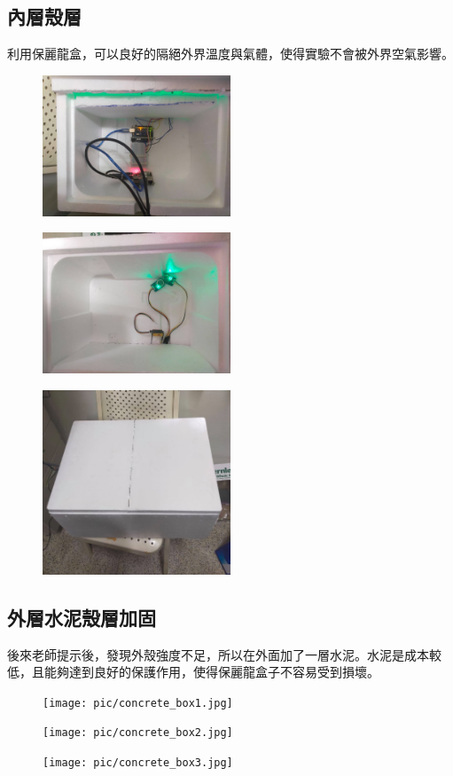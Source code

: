 	\subsection{內層殼層}
		利用保麗龍盒，可以良好的隔絕外界溫度與氣體，使得實驗不會被外界空氣影響。
		\begin{figure}[H]
			\centering
			\includegraphics[width=0.5\textwidth]{pic/box(1).jpg}
		\end{figure}
		\begin{figure}[H]
			\centering
			\includegraphics[width=0.5\textwidth]{pic/box(2).jpg}
		\end{figure}
		\begin{figure}[H]
			\centering
			\includegraphics[width=0.5\textwidth]{pic/box(3).jpg}
		\end{figure}
	\subsection{外層水泥殼層加固}
		後來老師提示後，發現外殼強度不足，所以在外面加了一層水泥。水泥是成本較低，且能夠達到良好的保護作用，使得保麗龍盒子不容易受到損壞。
		\begin{figure}[H]
			\centering
			\texttt{[image: pic/concrete\_box1.jpg]}
		\end{figure}
		\begin{figure}[H]
			\centering
			\texttt{[image: pic/concrete\_box2.jpg]}
		\end{figure}
		\begin{figure}[H]
			\centering
			\texttt{[image: pic/concrete\_box3.jpg]}
		\end{figure}

